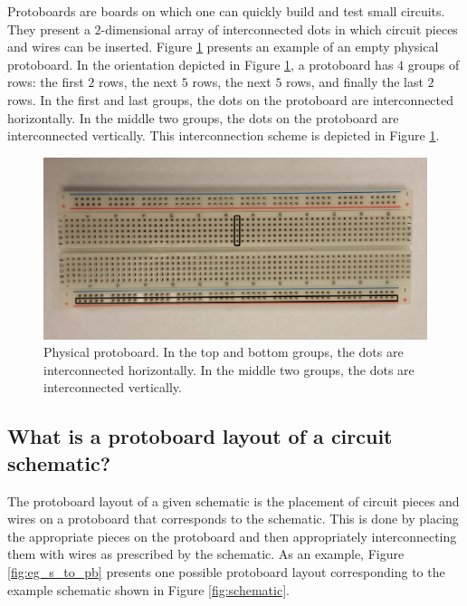 Protoboards are boards on which one can quickly build and test
small circuits. They present a $2$-dimensional array of interconnected dots
in which circuit pieces and wires can be inserted. Figure
\ref{fig:physical_protoboard} presents an example of an empty physical
protoboard. In
the orientation depicted in Figure \ref{fig:physical_protoboard}, a protoboard
has $4$ groups of rows: the first $2$ rows, the next $5$ rows, the next $5$
rows, and finally the last $2$ rows. In the first and last groups, the dots on
the protoboard are interconnected horizontally. In the middle
two groups, the dots on the protoboard are interconnected vertically. This
interconnection scheme is depicted in Figure \ref{fig:physical_protoboard}.

\begin{figure}
\begin{center}
\includegraphics[width=\textwidth]{Images/physical_protoboard.jpg}
\caption{Physical protoboard. In the top and bottom groups, the dots are
interconnected horizontally. In the middle two groups, the dots are
interconnected vertically.}
\label{fig:physical_protoboard}
\end{center}
\end{figure}

\subsection{What is a protoboard layout of a circuit schematic?}

The protoboard layout of a given schematic is the placement of circuit pieces
and wires on a protoboard that corresponds to the schematic. This is done by
placing the appropriate pieces on the protoboard and then appropriately
interconnecting them with wires as prescribed by the schematic. As an example,
Figure \ref{fig:eg_s_to_pb} presents one possible protoboard layout
corresponding to the example schematic shown in Figure \ref{fig:schematic}.

